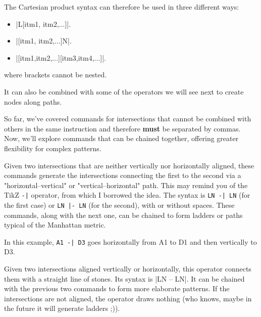 \begin{goban}[9, stone = {radius = 4pt}, mark = {line = {color = red}}]
	The Cartesian product syntax can therefore be used in three different ways:
\begin{itemize}
	\item |L[itm1, itm2,...]|.
	\item |[itm1, itm2,...]N|.
	\item |[itm1,itm2,...][itm3,itm4,...]|.
\end{itemize}
where brackets cannot be nested.

It can also be combined with some of the operators we will see next to create nodes along paths.

So far, we’ve covered commands for intersections that cannot be combined with others in the same instruction and therefore \textbf{must} be separated by commas. Now, we’ll explore commands that can be chained together, offering greater flexibility for complex patterns.


Given two intersections that are neither vertically nor horizontally aligned, these commands generate the intersections connecting the first to the second via a "horizontal--vertical" or "vertical--horizontal" path. This may remind you of the TikZ \verb+-|+ operator, from which I borrowed the idea. The syntax is \verb+LN -| LN+ (for the first case) or \verb+LN |- LN+ (for the second), with or without spaces. These commands, along with the next one, can be chained to form ladders or paths typical of the Manhattan metric.

\begin{codeexample}[width=6cm]
	\begin{goban}[label = {at = all}]
	\end{goban}
\end{codeexample}

In this example, \verb+A1 -| D3+ goes horizontally from A1 to D1 and then vertically to D3.


Given two intersections aligned vertically or horizontally, this operator connects them with a straight line of stones. Its syntax is |LN -- LN|. It can be chained with the previous two commands to form more elaborate patterns. If the intersections are not aligned, the operator draws nothing (who knows, maybe in the future it will generate ladders ;)).


\end{goban}

